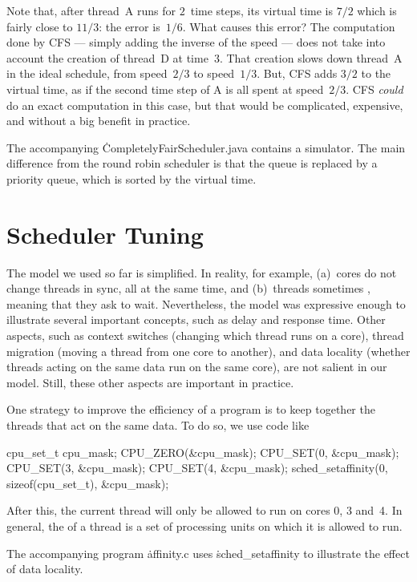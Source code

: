 Note that, after thread~A runs for $2$~time steps,
  its virtual time is $7/2$ which is fairly close to $11/3$:
  the error is~$1/6$.
What causes this error?
The computation done by CFS --- simply adding the inverse of the speed ---
  does not take into account the creation of thread~D at time~$3$.
That creation slows down thread~A in the ideal schedule,
  from speed~$2/3$ to speed~$1/3$.
But, CFS adds $3/2$ to the virtual time,
  as if the second time step of A is all spent at speed~$2/3$.
CFS \emph{could} do an exact computation in this case,
  but that would be complicated, expensive, and without a big benefit in practice.

The accompanying \.{CompletelyFairScheduler.java} contains a simulator.
The main difference from the round robin scheduler
  is that the queue is replaced by a priority queue,
  which is sorted by the virtual time.

\section*{Scheduler Tuning}

The model we used so far is simplified.
In reality, for example,
  (a)~cores do not change threads in sync, all at the same time, and
  (b)~threads sometimes , meaning that they ask to wait.
Nevertheless,
  the model was expressive enough to illustrate several important concepts,
  such as delay and response time.
Other aspects,
  such as
    context switches (changing which thread runs on a core),
    thread migration (moving a thread from one core to another), and
    data locality (whether threads acting on the same data run on the same core),
  are not salient in our model.
Still, these other aspects are important in practice.

One strategy to improve the efficiency of a program
  is to keep together the threads that act on the same data.
To do so, we use code like
\begin{ccode}
cpu_set_t cpu_mask;
CPU_ZERO(&cpu_mask);
CPU_SET(0, &cpu_mask); CPU_SET(3, &cpu_mask); CPU_SET(4, &cpu_mask);
sched_setaffinity(0, sizeof(cpu_set_t), &cpu_mask);
\end{ccode}
After this, the current thread will only be allowed to run on cores 0, 3 and~4.
In general,
  the  of a thread
  is a set of processing units on which it is allowed to run.

The accompanying program \.{affinity.c} uses \.{sched\_setaffinity}
  to illustrate the effect of data locality.



